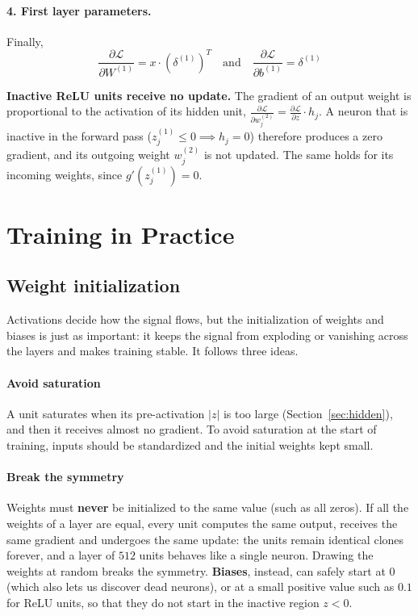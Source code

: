 \paragraph{4. First layer parameters.} Finally,
\begin{equation}
    \frac{\partial \mathcal{L}}{\partial W^{(1)}} = x \cdot \left(\delta^{(1)}\right)^T \quad \text{and} \quad \frac{\partial \mathcal{L}}{\partial b^{(1)}} = \delta^{(1)}
\end{equation}

\begin{note}
    \textbf{Inactive ReLU units receive no update.} The gradient of an output weight
    is proportional to the activation of its hidden unit,
    $\frac{\partial \mathcal{L}}{\partial w_j^{(2)}} = \frac{\partial \mathcal{L}}{\partial z} \cdot h_j$.
    A neuron that is inactive in the forward pass
    ($z_j^{(1)} \leq 0 \implies h_j = 0$) therefore produces a zero gradient, and its
    outgoing weight $w_j^{(2)}$ is not updated. The same holds for its incoming
    weights, since $g'(z_j^{(1)}) = 0$.
\end{note}

\section{Training in Practice}
\label{sec:practice}
\subsection{Weight initialization}
Activations decide how the signal flows, but the initialization of weights and
biases is just as important: it keeps the signal from exploding or vanishing across
the layers and makes training stable. It follows three ideas.

\paragraph{Avoid saturation} A unit saturates when its pre-activation $|z|$ is too
large (Section~\ref{sec:hidden}), and then it receives almost no gradient. To avoid
saturation at the start of training, inputs should be standardized and the initial
weights kept small.

\paragraph{Break the symmetry} Weights must \textbf{never} be initialized to the
same value (such as all zeros). If all the weights of a layer are equal, every unit
computes the same output, receives the same gradient and undergoes the same update:
the units remain identical clones forever, and a layer of $512$ units behaves like a
single neuron. Drawing the weights at random breaks the symmetry. \textbf{Biases},
instead, can safely start at $0$ (which also lets us discover dead neurons), or at a
small positive value such as $0.1$ for ReLU units, so that they do not start in the
inactive region $z < 0$.

